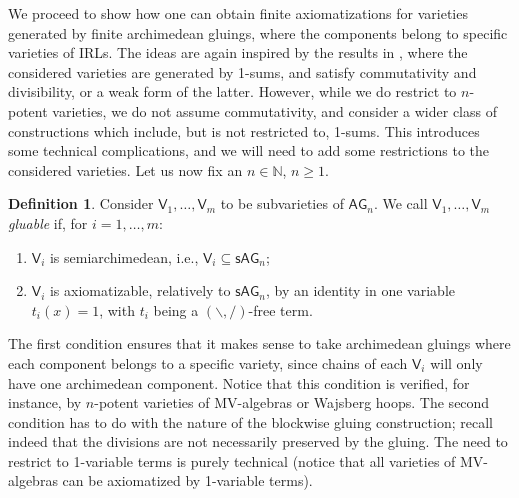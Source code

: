 \documentclass{amsart}
\theoremstyle{definition}
\newtheorem{definition}[theorem]{Definition}
\numberwithin{equation}{section}
\newcommand{\vv}[1]{\mathsf {#1}}
\newcommand{\sse}{\subseteq}
\newcommand{\BG}{\vv{AG}}
\newcommand{\ssBG}{\vv{sAG}}
\begin{document}
We proceed to show how one can obtain finite axiomatizations for varieties generated by finite archimedean gluings, where the components belong to specific varieties of IRLs. The ideas are again inspired by the results in \cite{AM2003,GalatosUgolinimanuscript}, where the considered varieties are generated by 1-sums, and satisfy commutativity and divisibility, or a weak form of the latter. However, while we do restrict to $n$-potent varieties, we do not assume commutativity, and consider a  wider class of constructions which include, but is not restricted to, 1-sums. This introduces some technical complications, and we will need to add some restrictions to the considered varieties. Let us now fix an $n \in \mathbb{N}$, $n \geq 1$. 
\begin{definition}\label{def:gluable}
	Consider $\vv V_1, \ldots, \vv V_m$ to be subvarieties of $\BG_n$. We call  $\vv V_1, \ldots, \vv V_m$ {\em gluable} if, for $i = 1, \ldots, m$:
\begin{enumerate}
	\item $\vv V_i$ is semiarchimedean, i.e., $\vv V_i \sse \ssBG_n$;
	\item $\vv V_i$ is axiomatizable, relatively to $\ssBG_n$, by an identity in one variable $t_i(x) = 1$, with $t_i$ being a $(\backslash,/)$-free term.
\end{enumerate}
\end{definition} 

The first condition ensures that it makes sense to take archimedean gluings where each component belongs to a specific variety, since chains of each $\vv V_i$ will only have one archimedean component. Notice that this condition is verified, for instance, by $n$-potent varieties of MV-algebras or Wajsberg hoops. The second condition has to do with the nature of the blockwise gluing construction; recall indeed that the divisions are not necessarily preserved by the gluing. The need to restrict to 1-variable terms is purely technical (notice that all varieties of MV-algebras can be axiomatized by 1-variable terms).
\end{document}
